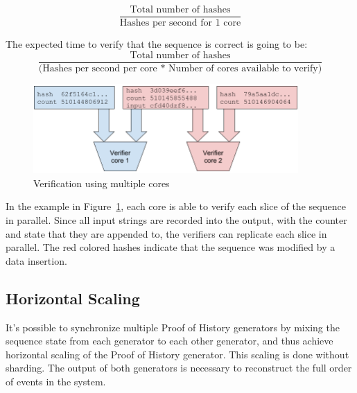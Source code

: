 \documentclass[12pt]{article}
\begin{document}
\[
\frac{\textrm{Total number of hashes}}{\textrm{Hashes per second for 1 core}}
\]

\noindent The expected time to verify that the sequence is correct is going to be:\\

\[
\frac{\textrm{Total number of hashes}}{\textrm{(Hashes per second per core * Number of cores available to verify)}}
\]

\begin{figure}
  \begin{center}
    \centering
    \includegraphics[width=0.9\textwidth]{figures/fig_4.png}
    \caption[Figure 4]{Verification using multiple cores\label{fig:poh_verify}}
  \end{center}
  \end{figure}

In the example in Figure~\ref{fig:poh_verify}, each core is able to verify each slice of the sequence in parallel. Since all input strings are recorded into the output, with the counter and state that they are appended to, the verifiers can replicate each slice in parallel. The red colored hashes indicate that the sequence was modified by a data insertion.

\subsection{Horizontal Scaling}\label{poh:scale}
It’s possible to synchronize multiple Proof of History generators by mixing the sequence state from each generator to each other generator, and thus achieve horizontal scaling of the Proof of History generator. This scaling is done without sharding. The output of both generators is necessary to reconstruct the full order of events in the system.
\end{document}
